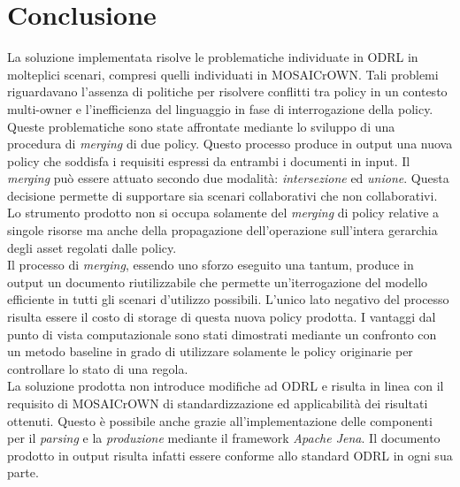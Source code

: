 \documentclass[12pt,a4paper,twoside]{book}
\begin{document}
\chapter{Conclusione}
La soluzione implementata risolve le problematiche individuate in ODRL in molteplici scenari, compresi quelli individuati in MOSAICrOWN. Tali problemi riguardavano l'assenza di politiche per risolvere conflitti tra policy in un contesto multi-owner e l'inefficienza del linguaggio in fase di interrogazione della policy. Queste problematiche sono state affrontate mediante lo sviluppo di una procedura di \textit{merging} di due policy. Questo processo produce in output una nuova policy che soddisfa i requisiti espressi da entrambi i documenti in input. Il \textit{merging} può essere attuato secondo due modalità: \textit{intersezione} ed \textit{unione}. Questa decisione permette di supportare sia scenari collaborativi che non collaborativi. Lo strumento prodotto non si occupa solamente del \textit{merging} di policy relative a singole risorse ma anche della propagazione dell'operazione sull'intera gerarchia degli asset regolati dalle policy.\\
Il processo di \textit{merging}, essendo uno sforzo eseguito una tantum, produce in output un documento riutilizzabile che permette un'iterrogazione del modello efficiente in tutti gli scenari d'utilizzo possibili. L'unico lato negativo del processo risulta essere il costo di storage di questa nuova policy prodotta. I vantaggi dal punto di vista computazionale sono stati dimostrati mediante un confronto con un metodo baseline in grado di utilizzare solamente le policy originarie per controllare lo stato di una regola.\\
La soluzione prodotta non introduce modifiche ad ODRL e risulta in linea con il requisito di MOSAICrOWN di standardizzazione ed applicabilità dei risultati ottenuti. Questo è possibile anche grazie all'implementazione delle componenti per il \textit{parsing} e la \textit{produzione} mediante il framework \textit{Apache Jena}. Il documento prodotto in output risulta infatti essere conforme allo standard ODRL in ogni sua parte. 
\end{document}
